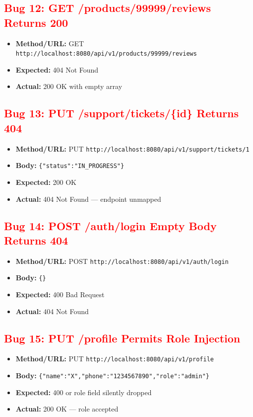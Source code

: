 \documentclass{article}
\begin{document}
\subsection*{\textcolor{red}{Bug 12: GET /products/99999/reviews Returns 200}}
\begin{itemize}[noitemsep]
  \item \textbf{Method/URL:} GET \texttt{http://localhost:8080/api/v1/products/99999/reviews}
  \item \textbf{Expected:} 404 Not Found
  \item \textbf{Actual:} 200 OK with empty array
\end{itemize}

\subsection*{\textcolor{red}{Bug 13: PUT /support/tickets/\{id\} Returns 404}}
\begin{itemize}[noitemsep]
  \item \textbf{Method/URL:} PUT \texttt{http://localhost:8080/api/v1/support/tickets/1}
  \item \textbf{Body:} \texttt{\{"status":"IN\_PROGRESS"\}}
  \item \textbf{Expected:} 200 OK
  \item \textbf{Actual:} 404 Not Found — endpoint unmapped
\end{itemize}

\subsection*{\textcolor{red}{Bug 14: POST /auth/login Empty Body Returns 404}}
\begin{itemize}[noitemsep]
  \item \textbf{Method/URL:} POST \texttt{http://localhost:8080/api/v1/auth/login}
  \item \textbf{Body:} \texttt{\{\}}
  \item \textbf{Expected:} 400 Bad Request
  \item \textbf{Actual:} 404 Not Found
\end{itemize}

\subsection*{\textcolor{red}{Bug 15: PUT /profile Permits Role Injection}}
\begin{itemize}[noitemsep]
  \item \textbf{Method/URL:} PUT \texttt{http://localhost:8080/api/v1/profile}
  \item \textbf{Body:} \texttt{\{"name":"X","phone":"1234567890","role":"admin"\}}
  \item \textbf{Expected:} 400 or role field silently dropped
  \item \textbf{Actual:} 200 OK — role accepted
\end{itemize}
\end{document}
